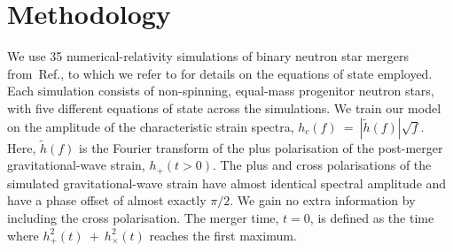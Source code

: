\documentclass[../Thesis.tex]{subfiles}
\begin{document}
\section{Methodology}
    \sloppy We use 35 numerical-relativity simulations of binary neutron star mergers from~Ref.\cite{Rezzolla2016}, to which we refer to for details on the equations of state employed.  Each simulation consists of non-spinning, equal-mass progenitor neutron stars, with five different equations of state across the simulations.  We train our model on the amplitude  of the characteristic strain spectra, $h_c(f)~=~|\tilde{h}(f)|\sqrt{f}$. Here,  $\tilde{h}(f)$ is the Fourier transform of the plus polarisation of the post-merger gravitational-wave strain, $h_+(t>0)$. The plus and cross polarisations of the simulated gravitational-wave strain have almost identical spectral amplitude and have a phase offset of almost exactly $\pi/2$. We gain no extra information by including the cross polarisation. The merger time, $t=0$, is defined as the time where $h_+^2(t)~+~h_\times^2(t)$ reaches the first maximum. \par
   
\end{document}
